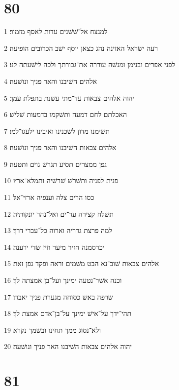 \chapter{80}

\par 1 למנצח אל־שׁשׁנים עדות לאסף מזמור׃
\par 2 רעה ישׂראל האזינה נהג כצאן יוסף ישׁב הכרובים הופיעה׃
\par 3 לפני אפרים ובנימן ומנשׁה עוררה את־גבורתך ולכה לישׁעתה לנו׃
\par 4 אלהים השׁיבנו והאר פניך ונושׁעה׃
\par 5 יהוה אלהים צבאות עד־מתי עשׁנת בתפלת עמך׃
\par 6 האכלתם לחם דמעה ותשׁקמו בדמעות שׁלישׁ׃
\par 7 תשׂימנו מדון לשׁכנינו ואיבינו ילעגו־למו׃
\par 8 אלהים צבאות השׁיבנו והאר פניך ונושׁעה׃
\par 9 גפן ממצרים תסיע תגרשׁ גוים ותטעה׃
\par 10 פנית לפניה ותשׁרשׁ שׁרשׁיה ותמלא־ארץ׃
\par 11 כסו הרים צלה וענפיה ארזי־אל׃
\par 12 תשׁלח קצירה עד־ים ואל־נהר יונקותיה׃
\par 13 למה פרצת גדריה וארוה כל־עברי דרך׃
\par 14 יכרסמנה חזיר מיער וזיז שׂדי ירענה׃
\par 15 אלהים צבאות שׁוב־נא הבט משׁמים וראה ופקד גפן זאת׃
\par 16 וכנה אשׁר־נטעה ימינך ועל־בן אמצתה לך׃
\par 17 שׂרפה באשׁ כסוחה מגערת פניך יאבדו׃
\par 18 תהי־ידך על־אישׁ ימינך על־בן־אדם אמצת לך׃
\par 19 ולא־נסוג ממך תחינו ובשׁמך נקרא׃
\par 20 יהוה אלהים צבאות השׁיבנו האר פניך ונושׁעה׃

\chapter{81}


